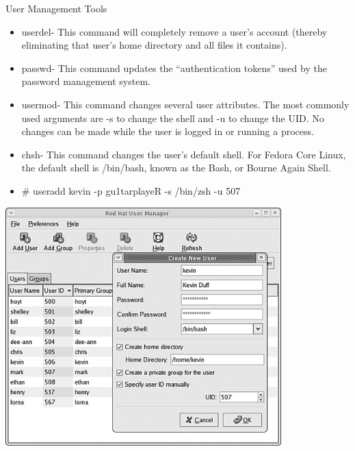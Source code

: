 \documentclass{beamer}
\begin{document}
\begin{frame}{User Management Tools }
\begin{itemize}
\item userdel- This command will completely remove a user's account (thereby eliminating that user's home directory and all files it contains).
\item passwd- This command updates the ``authentication tokens'' used by the password management system.
\item usermod- This command changes several user attributes. The most commonly used arguments are -s to change the shell and -u to change the UID. No changes can be made while the user is logged in or running a process.
\item chsh- This command changes the user's default shell. For Fedora Core Linux, the default shell is /bin/bash, known as the Bash, or Bourne Again Shell.
\end{itemize}
\end{frame}

\begin{frame}{}
\begin{itemize}
\item \# useradd kevin -p gu1tarplayeR -s /bin/zsh -u 507
\end{itemize}
\includegraphics[width=0.8\textwidth]{../imgs/useradd.png}
\end{frame}
\end{document}
